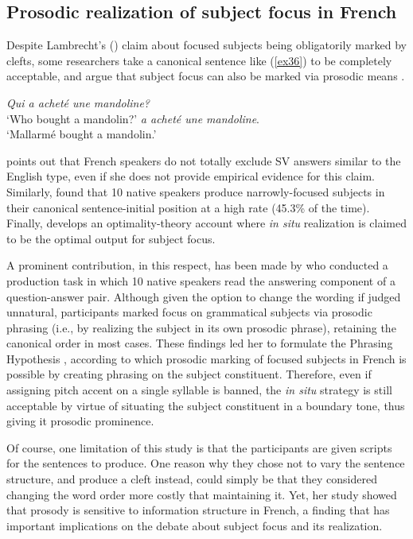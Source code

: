  \subsection{Prosodic realization of subject focus in French}
Despite Lambrecht’s (\citeyear{lambrecht1996information}) claim about focused subjects being obligatorily marked by clefts, some researchers take a canonical sentence like (\ref{ex36}) to be completely acceptable, and argue that subject focus can also be marked via prosodic means \parencite{beyssade2004prosody}.

 \ea \label{ex36}
\ea  \textit{Qui a acheté une mandoline?}\\
 `Who bought a mandolin?'
 \normalsize \textit{a acheté une mandoline}.\\
`Mallarmé bought a mandolin.' \hfill \parencite[478]{beyssade2004prosody}   
\z \z 


\textcite{belletti2010structures} points out that French speakers do not totally exclude SV answers similar to the English type, even if she does not provide empirical evidence for this claim. Similarly, \textcite{skopeteas2010focus}  found that 10 native speakers produce narrowly-focused subjects in  their canonical sentence-initial position at a high rate (45.3\% of the time). Finally, \textcite{samek2005prosody} develops an optimality-theory account where \textit{in situ} realization is claimed to be the optimal output for subject focus. 

A prominent contribution, in this respect, has been made by \textcite{fery2001focus} who conducted a production task in which 10 native speakers read the answering component of a question-answer pair. Although given the option to change the wording if judged unnatural, participants marked focus on grammatical subjects via prosodic phrasing (i.e., by realizing the subject in its own prosodic phrase), retaining the canonical order in most cases. These findings led her to formulate the Phrasing Hypothesis \parencite{fery2001focus}, according to which prosodic marking of focused subjects in French is possible by creating phrasing on the subject constituent. Therefore, even if assigning pitch accent on a single syllable is banned, the \textit{in situ} strategy is still acceptable by virtue of situating the subject constituent in a boundary tone, thus giving it prosodic prominence. 

Of course, one limitation of this study is that the participants are given scripts for the sentences to produce. One reason why they chose not to vary the sentence structure, and produce a cleft instead, could simply be that they considered changing the word order more costly that maintaining it. Yet, her study showed that prosody is sensitive to information structure in French, a finding that has important implications on the debate about subject focus and its realization.

